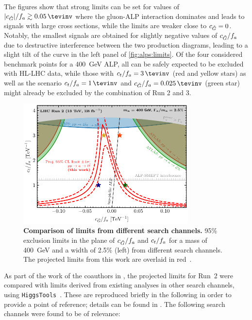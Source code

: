 The figures show that strong limits can be set for values of $|\cG|/f_a \gtrsim \SI{0.05}{\tevinv}$ where the gluon-ALP interaction dominates and leads to signals with large cross sections, while the limits are weaker close to $c_{\tilde{G}} = 0$. Notably, the smallest signals are obtained for slightly negative values of $c_{\tilde{G}}/f_a$ due to destructive interference between the two production diagrams, leading to a slight tilt of the curve in the left panel of \cref{fig:alps:limits}. Of the four considered benchmark points for a \SI{400}{\GeV} ALP, all can be safely expected to be excluded with HL-LHC data, while those with $\ct/f_a = \SI{3}{\tevinv}$ (red and yellow stars) as well as the scenario $\ct/f_a = \SI{1}{\tevinv}$ and $\cG/f_a = \SI{+0.025}{\tevinv}$ (green star) might already be excluded by the combination of Run 2 and 3.

\begin{figure}[t]
    \centering
    \includegraphics[width=0.8\textwidth]{figures/alps/sum400.pdf}
    \caption{
        \textbf{Comparison of limits from different search channels.} 95\% exclusion limits in the plane of $c_{\tilde{G}}/f_a$ and $c_t/f_a$ for a mass of \SI{400}{\GeV} and a width of 2.5\% (left) from different search channels. The projected limits from this work are overlaid in red~\cite{Jeppe:2024sxt}.
    }
    \label{fig:alps:summary}
\end{figure}

As part of the work of the coauthors in , the projected limits for Run~2 were compared with limits derived from existing analyses in other search channels, using \texttt{HiggsTools}~\cite{Bahl:2022igd}. These are reproduced briefly in the following in order to provide a point of reference; details can be found in . The following search channels were found to be of relevance:

